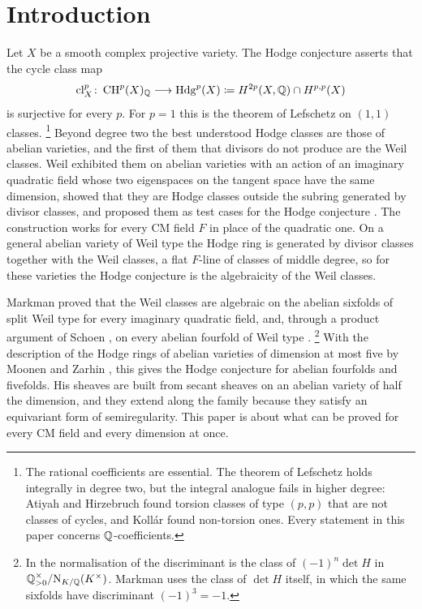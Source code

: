 \section{Introduction}\label{sec:intro}

Let $X$ be a smooth complex projective variety. The Hodge conjecture asserts
that the cycle class map
\[
  \mathrm{cl}^{p}_{X}\colon \operatorname{CH}^{p}(X)_{\mathbb{Q}}\longrightarrow \mathrm{Hdg}^{p}(X)
  \coloneqq H^{2p}(X,\mathbb{Q})\cap H^{p,p}(X)
\]
is surjective for every $p$. For $p=1$ this is the theorem of Lefschetz on
$(1,1)$ classes.%
\footnote{The rational coefficients are essential. The theorem of Lefschetz
holds integrally in degree two, but the integral analogue fails in higher
degree: Atiyah and Hirzebruch found torsion classes of type $(p,p)$ that are
not classes of cycles, and Koll\'ar found non-torsion ones. Every statement in
this paper concerns $\mathbb{Q}$-coefficients.}
Beyond degree two the best understood Hodge classes are those of abelian
varieties, and the first of them that divisors do not produce are the Weil
classes. Weil exhibited them on abelian varieties with an action of an
imaginary quadratic field whose two eigenspaces on the tangent space have the
same dimension, showed that they are Hodge classes outside the subring
generated by divisor classes, and proposed them as test cases for the Hodge
conjecture \cite{Weil77}. The construction works for every CM field $F$ in
place of the quadratic one. On a general abelian variety of Weil type the
Hodge ring is generated by divisor classes together with the Weil classes, a
flat $F$-line of classes of middle degree, so for these varieties the Hodge
conjecture is the algebraicity of the Weil classes.

Markman proved that the Weil classes are algebraic on the abelian sixfolds of
split Weil type for every imaginary quadratic field, and, through a product
argument of Schoen \cite[Proposition~10]{Sch98}, on every abelian fourfold of
Weil type \cite{Mar25a,Mar25b}.%
\footnote{In the normalisation of  the discriminant is the
class of $(-1)^{n}\det H$ in $\mathbb{Q}^{\times}_{>0}/\mathrm{N}_{K/\mathbb{Q}}(K^{\times})$.
Markman uses the class of $\det H$ itself, in which the same sixfolds have
discriminant $(-1)^{3}=-1$.}
With the description of the Hodge rings of abelian varieties of dimension at
most five by Moonen and Zarhin \cite{MZ99}, this gives the Hodge conjecture
for abelian fourfolds and fivefolds. His sheaves are built from secant sheaves
on an abelian variety of half the dimension, and they extend along the family
because they satisfy an equivariant form of semiregularity. This paper is
about what can be proved for every CM field and every dimension at once.

